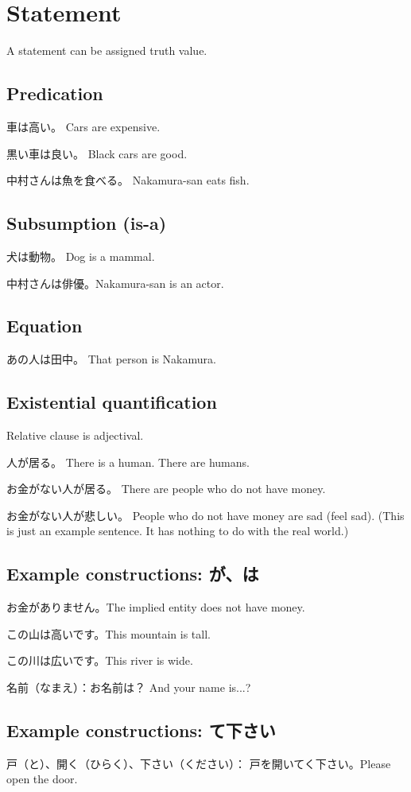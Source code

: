 \chapter{Statement}

A statement can be assigned truth value.

\section{Predication}

車は高い。
Cars are expensive.

黒い車は良い。
Black cars are good.

中村さんは魚を食べる。
Nakamura-san eats fish.

\section{Subsumption (is-a)}

犬は動物。
Dog is a mammal.

中村さんは俳優。Nakamura-san is an actor.

\section{Equation}

あの人は田中。
That person is Nakamura.

\section{Existential quantification}

Relative clause is adjectival.

人が居る。
There is a human.
There are humans.

お金がない人が居る。
There are people who do not have money.

お金がない人が悲しい。
People who do not have money are sad (feel sad).
(This is just an example sentence.
It has nothing to do with the real world.)

\section{Example constructions: が、は}

お金がありません。The implied entity does not have money.

この山は高いです。This mountain is tall.

この川は広いです。This river is wide.

名前（なまえ）：お名前は？
And your name is...?

\section{Example constructions: て下さい}

戸（と）、開く（ひらく）、下さい（ください）：
戸を開いてく下さい。Please open the door.
